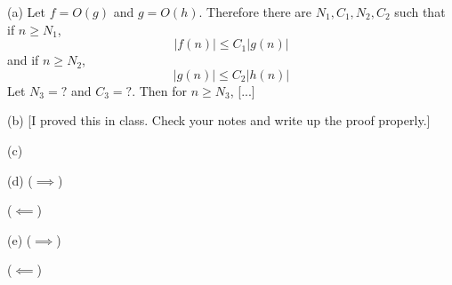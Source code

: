 
(a)
Let $f = O(g)$ and $g = O(h)$.
Therefore there are $N_1, C_1, N_2, C_2$ such that
if $n \geq N_1$,
\[
|f(n)| \leq C_1 |g(n)|
\]
and if $n \geq N_2$,
\[
|g(n)| \leq C_2 |h(n)|
\]
Let $N_3 = ?$ and $C_3 = ?$.
Then for $n \geq N_3$,
[...]

(b)
[I proved this in class. Check your notes and write up the proof
  properly.]


(c)

(d)
($\implies$)


($\impliedby$)

(e)
($\implies$)


($\impliedby$)


